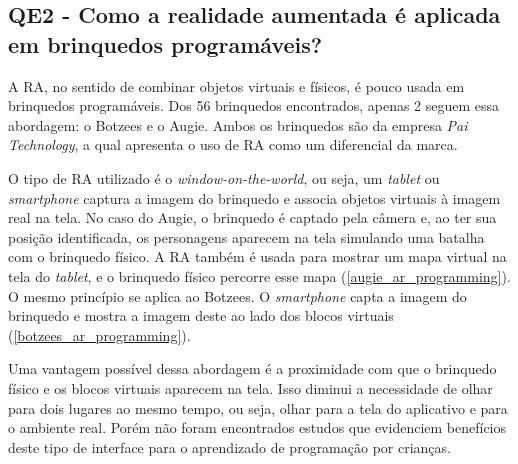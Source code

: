 {\subsection{QE2 - Como a realidade aumentada é aplicada em brinquedos programáveis?}
A \ac{RA}, no sentido de combinar objetos virtuais e físicos, é pouco usada em brinquedos programáveis. Dos 56 brinquedos encontrados, apenas 2 seguem essa abordagem: o Botzees e o Augie. Ambos os brinquedos são da empresa \textit{Pai Technology}, a qual apresenta o uso de \ac{RA} como um diferencial da marca.

O tipo de RA utilizado é o \textit{window-on-the-world}, ou seja, um \textit{tablet} ou \textit{smartphone} captura a imagem do brinquedo e associa objetos virtuais à imagem real na tela. No caso do Augie, o brinquedo é captado pela câmera e, ao ter sua posição identificada, os personagens aparecem na tela simulando uma batalha com o brinquedo físico. A RA também é usada para mostrar um mapa virtual na tela do \textit{tablet}, e o brinquedo físico percorre esse mapa (\autoref{augie_ar_programming}). O mesmo princípio se aplica ao Botzees. O \textit{smartphone} capta a imagem do brinquedo e mostra a imagem deste ao lado dos blocos virtuais (\autoref{botzees_ar_programming}).

Uma vantagem possível dessa abordagem é a proximidade com que o brinquedo físico e os blocos virtuais aparecem na tela. Isso diminui a necessidade de olhar para dois lugares ao mesmo tempo, ou seja, olhar para a tela do aplicativo e para o ambiente real. Porém não foram encontrados estudos que evidenciem benefícios deste tipo de interface para o aprendizado de programação por crianças.

}
